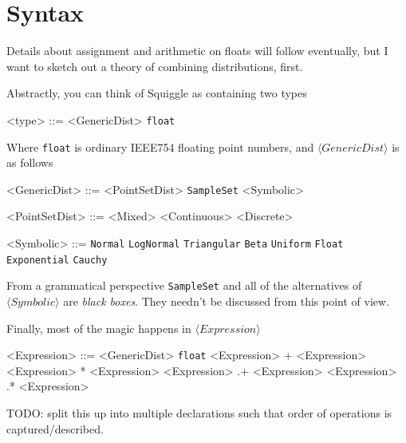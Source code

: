 \documentclass[../main.tex]{subfiles}
\begin{document}
\section{Syntax}\label{section:syntax}

Details about assignment and arithmetic on floats will follow eventually, but I want to sketch out a theory of combining distributions, first.

Abstractly, you can think of Squiggle as containing two types
\begin{grammar}
  <type> ::= <GenericDist> \alt \texttt{float}
\end{grammar}\label{gram:type}

Where \texttt{float} is ordinary IEEE754 floating point numbers, and $\langle \textit{GenericDist} \rangle$ is as follows

\begin{grammar}
  <GenericDist> ::= <PointSetDist> \alt \texttt{SampleSet} \alt <Symbolic>

  <PointSetDist> ::= <Mixed> \alt <Continuous> \alt <Discrete>

  <Symbolic> ::= \texttt{Normal} \alt \texttt{LogNormal} \alt \texttt{Triangular} \alt \texttt{Beta} \alt \texttt{Uniform} \alt \texttt{Float} \alt \texttt{Exponential} \alt \texttt{Cauchy}
\end{grammar}

From a grammatical perspective \texttt{SampleSet} and all of the alternatives of $\langle \textit{Symbolic} \rangle$ are \textit{black boxes}. They needn't be discussed from this point of view.

Finally, most of the magic happens in $\langle \textit{Expression} \rangle$

\begin{grammar}
  <Expression> ::= <GenericDist> \alt \texttt{float} \alt <Expression> + <Expression> \alt <Expression> * <Expression> \alt <Expression> .+ <Expression> \alt <Expression> .* <Expression>
\end{grammar}

TODO: split this up into multiple declarations such that order of operations is captured/described.
\end{document}
